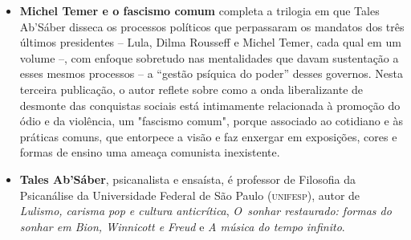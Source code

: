 \begin{itemize}


\item \textbf{Michel Temer e o fascismo comum} completa a trilogia em que Tales Ab'Sáber disseca
os processos políticos que perpassaram os mandatos dos três últimos presidentes -- Lula, Dilma
Rousseff e Michel Temer, cada qual em um volume --, com enfoque sobretudo nas mentalidades
que davam sustentação a esses mesmos processos -- a ``gestão psíquica do poder'' desses governos.
Nesta terceira publicação, o autor reflete sobre como a onda liberalizante de desmonte das
conquistas sociais está intimamente relacionada à promoção do ódio e da violência, um "fascismo
comum", porque associado ao cotidiano e às práticas comuns, que entorpece a visão
e faz enxergar em exposições, cores e formas de ensino uma ameaça comunista inexistente.
  
\item \textbf{Tales Ab’Sáber}, psicanalista e ensaísta, é professor de Filosofia da Psicanálise da Universidade Federal 
de São Paulo (\textsc{unifesp}), autor de 
\emph{Lulismo, carisma pop e cultura anticrítica},
\textit{O~sonhar
restaurado: formas do sonhar em Bion, Winnicott e Freud} e
\textit{A música do tempo infinito}. 

\end{itemize}

